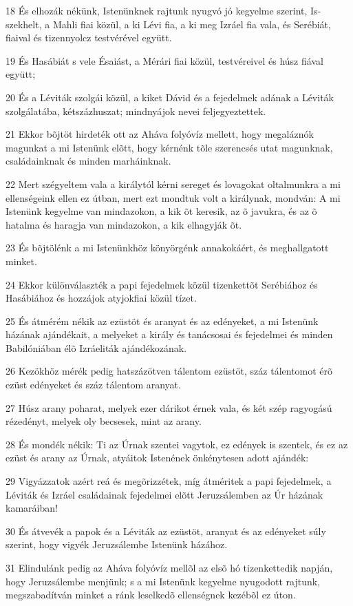 {\par 18 És elhozák nékünk, Istenünknek rajtunk nyugvó jó kegyelme szerint, Is-szekhelt, a Mahli fiai közül, a ki Lévi fia, a ki meg Izráel fia vala, és Serébiát, fiaival és tizennyolcz testvérével együtt.
\par 19 És Hasábiát s vele Ésaiást, a Mérári fiai közül, testvéreivel és húsz fiával együtt;
\par 20 És a Léviták szolgái közül, a kiket Dávid és a fejedelmek adának a Léviták szolgálatába, kétszázhuszat; mindnyájok nevei feljegyeztettek.
\par 21 Ekkor bõjtöt hirdeték ott az Aháva folyóvíz mellett, hogy megaláznók magunkat a mi Istenünk elõtt, hogy kérnénk tõle szerencsés utat magunknak, családainknak és minden marháinknak.
\par 22 Mert szégyeltem vala a királytól kérni sereget és lovagokat oltalmunkra a mi ellenségeink ellen ez útban, mert ezt mondtuk volt a királynak, mondván: A mi Istenünk kegyelme van mindazokon, a kik õt keresik, az õ javukra, és az õ hatalma és haragja van mindazokon, a kik elhagyják õt.
\par 23 És bõjtölénk a mi Istenünkhöz könyörgénk annakokáért, és meghallgatott minket.
\par 24 Ekkor különválaszték a papi fejedelmek közül tizenkettõt Serébiához és Hasábiához és hozzájok atyjokfiai közül tízet.
\par 25 És átmérém nékik az ezüstöt és aranyat és az edényeket, a mi Istenünk házának ajándékait, a melyeket a király és tanácsosai és fejedelmei és minden Babilóniában élõ Izráeliták ajándékozának.
\par 26 Kezökhöz mérék pedig hatszázötven tálentom ezüstöt, száz tálentomot érõ ezüst edényeket és száz tálentom aranyat.
\par 27 Húsz arany poharat, melyek ezer dárikot érnek vala, és két szép ragyogású rézedényt, melyek oly becsesek, mint az arany.
\par 28 És mondék nékik: Ti az Úrnak szentei vagytok, ez edények is szentek, és ez az ezüst és arany az Úrnak, atyáitok Istenének önkénytesen adott ajándék:
\par 29 Vigyázzatok azért reá és megõrizzétek, míg átméritek a papi fejedelmek, a Léviták és Izráel családainak fejedelmei elõtt Jeruzsálemben az Úr házának kamaráiban!
\par 30 És átvevék a papok és a Léviták az ezüstöt, aranyat és az edényeket súly szerint, hogy vigyék Jeruzsálembe Istenünk házához.
\par 31 Elindulánk pedig az Aháva folyóvíz mellõl az elsõ hó tizenkettedik napján, hogy Jeruzsálembe menjünk; s a mi Istenünk kegyelme nyugodott rajtunk, megszabadítván minket a ránk leselkedõ ellenségnek kezébõl ez úton.
}
